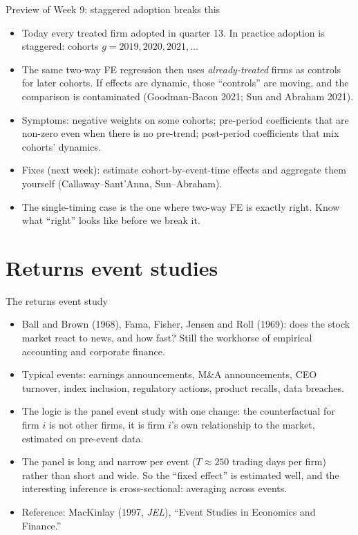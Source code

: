 \documentclass[aspectratio=169,11pt]{beamer}
\begin{document}
\begin{frame}{Preview of Week 9: staggered adoption breaks this}
\begin{itemize}
	\item Today every treated firm adopted in quarter 13. In practice adoption is
	\alert{staggered}: cohorts $g = 2019, 2020, 2021, \dots$
	\medskip
	\item The same two-way FE regression then uses \emph{already-treated} firms as controls for
	later cohorts. If effects are dynamic, those ``controls'' are moving, and the comparison is
	contaminated (Goodman-Bacon 2021; Sun and Abraham 2021).
	\medskip
	\item Symptoms: negative weights on some cohorts; pre-period coefficients that are non-zero
	even when there is no pre-trend; post-period coefficients that mix cohorts' dynamics.
	\medskip
	\item Fixes (next week): estimate cohort-by-event-time effects and aggregate them yourself
	(Callaway--Sant'Anna, Sun--Abraham).
	\medskip
	\item The single-timing case is the one where two-way FE is exactly right. Know what
	``right'' looks like before we break it.
\end{itemize}
\end{frame}


\section{Returns event studies}

\begin{frame}{The returns event study}
\begin{itemize}
	\item Ball and Brown (1968), Fama, Fisher, Jensen and Roll (1969): does the stock market react to
	news, and how fast? Still the workhorse of empirical accounting and corporate finance.
	\medskip
	\item Typical events: earnings announcements, M\&A announcements, CEO turnover, index inclusion,
	regulatory actions, product recalls, data breaches.
	\medskip
	\item The logic is the panel event study with one change: the counterfactual for firm $i$
	is not other firms, it is \alert{firm $i$'s own relationship to the market}, estimated on
	pre-event data.
	\medskip
	\item The panel is long and narrow per event ($T \approx 250$ trading days per firm) rather than
	short and wide. So the ``fixed effect'' is estimated well, and the interesting inference is
	cross-sectional: averaging across events.
	\medskip
	\item Reference: MacKinlay (1997, \emph{JEL}), ``Event Studies in Economics and Finance.''
\end{itemize}
\end{frame}
\end{document}
